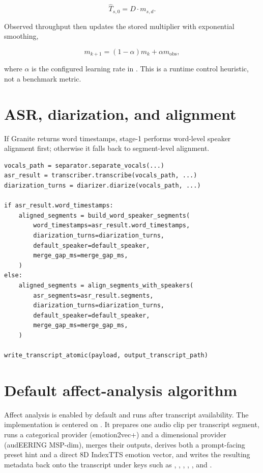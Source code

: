 \begin{equation}
\hat{T}_{s,0} = D \cdot m_{s,d}.
\end{equation}

Observed throughput then updates the stored multiplier with exponential smoothing,

\begin{equation}
m_{k+1} = (1 - \alpha)m_k + \alpha m_{\mathrm{obs}},
\end{equation}

where \(\alpha\) is the configured learning rate in . This is a runtime control heuristic, not a benchmark metric.

\section{ASR, diarization, and alignment}

If Granite returns word timestamps, stage-1 performs word-level speaker alignment first; otherwise it falls back to segment-level alignment.

\begin{lstlisting}[style=cfpython,caption={Condensed stage-1 orchestration flow adapted from \codepath{src/card_framework/audio_pipeline/orchestrator.py}.},label={lst:stage1flow}]
vocals_path = separator.separate_vocals(...)
asr_result = transcriber.transcribe(vocals_path, ...)
diarization_turns = diarizer.diarize(vocals_path, ...)

if asr_result.word_timestamps:
    aligned_segments = build_word_speaker_segments(
        word_timestamps=asr_result.word_timestamps,
        diarization_turns=diarization_turns,
        default_speaker=default_speaker,
        merge_gap_ms=merge_gap_ms,
    )
else:
    aligned_segments = align_segments_with_speakers(
        asr_segments=asr_result.segments,
        diarization_turns=diarization_turns,
        default_speaker=default_speaker,
        merge_gap_ms=merge_gap_ms,
    )

write_transcript_atomic(payload, output_transcript_path)
\end{lstlisting}

\section{Default affect-analysis algorithm}

Affect analysis is enabled by default and runs after transcript availability. The implementation is centered on . It prepares one audio clip per transcript segment, runs a categorical provider (emotion2vec+) and a dimensional provider (audEERING MSP-dim), merges their outputs, derives both a prompt-facing preset hint and a direct 8D IndexTTS emotion vector, and writes the resulting metadata back onto the transcript under keys such as , , , , , and .

